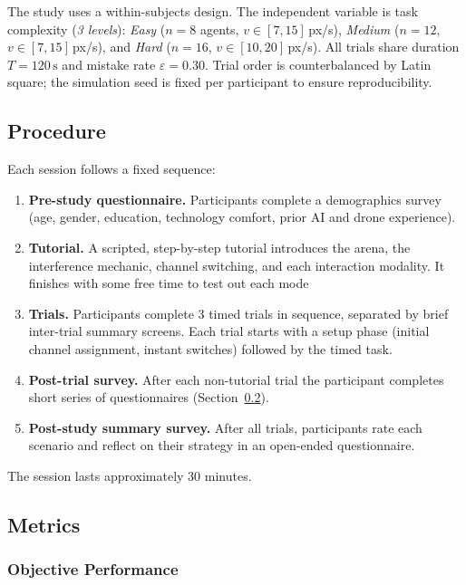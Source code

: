 \documentclass[10pt]{article}
\theoremstyle{definition}
\begin{document}
The study uses a within-subjects design. The independent variable is task complexity (\textit{3 levels}): \textit{Easy} ($n=8$ agents, $v \in [7, 15]$\,px/s), \textit{Medium} ($n=12$, $v \in [7, 15]$\,px/s), and \textit{Hard} ($n=16$, $v \in [10, 20]$\,px/s). All trials share duration $T = 120\,\mathrm{s}$ and mistake rate $\varepsilon = 0.30$. Trial order is counterbalanced by Latin square; the simulation seed is fixed per participant to ensure reproducibility.

\subsection{Procedure}

Each session follows a fixed sequence:
\begin{enumerate}[noitemsep]
  \item \textbf{Pre-study questionnaire.} Participants complete a demographics survey (age, gender, education, technology comfort, prior AI and drone experience).
  \item \textbf{Tutorial.} A scripted, step-by-step tutorial introduces the arena, the interference mechanic, channel switching, and each interaction modality. It finishes with some free time to test out each mode
  \item \textbf{Trials.} Participants complete 3 timed trials in sequence, separated by brief inter-trial summary screens. Each trial starts with a setup phase (initial channel assignment, instant switches) followed by the timed task.
  \item \textbf{Post-trial survey.} After each non-tutorial trial the participant completes short series of questionnaires (Section~\ref{sec:metrics}).
  \item \textbf{Post-study summary survey.} After all trials, participants rate each scenario and reflect on their strategy in an open-ended questionnaire.
\end{enumerate}

The session lasts approximately 30 minutes.

\subsection{Metrics}\label{sec:metrics}

\subsubsection{Objective Performance}
\end{document}
